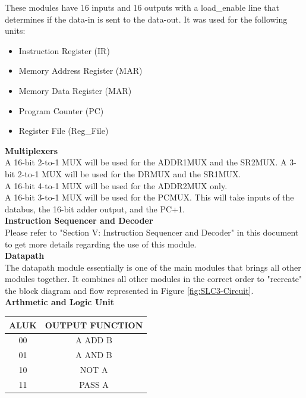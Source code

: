 \documentclass[journal, twocolumn, final,11pt,letterpaper]{IEEEtran}
\begin{document}
These modules have 16 inputs and 16 outputs with a load\_enable line that determines if the data-in is sent to the data-out. It was used for the following units: 
\begin{itemize}
	\item Instruction Register (IR)
	\item Memory Address Register (MAR)
	\item Memory Data Register (MAR)
	\item Program Counter (PC)
	\item Register File (Reg\_File)
\end{itemize} 

\normalsize\textbf{Multiplexers} \\

A 16-bit 2-to-1 MUX will be used for the ADDR1MUX and the SR2MUX. A 3-bit 2-to-1 MUX will be used for the DRMUX and the SR1MUX. \\

A 16-bit 4-to-1 MUX will be used for the ADDR2MUX only. \\

A 16-bit 3-to-1 MUX will be used for the PCMUX. This will take inputs of the databus, the 16-bit adder output, and the PC+1. \\

\normalsize\textbf{Instruction Sequencer and Decoder } \\

Please refer to "Section V: Instruction Sequencer and Decoder" in this document to get more details regarding the use of this module. \\

\normalsize\textbf{Datapath} \\

The datapath module essentially is one of the main modules that brings all other modules together. It combines all other modules in the correct order to "recreate" the block diagram and flow represented in Figure \ref{fig:SLC3-Circuit}.\\


\normalsize\textbf{Arthmetic and Logic Unit} \\
\begin{table}[htbp]
	\centering
	\begin{tabular}{cc}	%
		\toprule	%
		ALUK & OUTPUT FUNCTION \\
		\midrule
		00 & A ADD B \\
		01 & A AND B \\
		10 & NOT A \\
		11 & PASS A \\
		\bottomrule	%
	\end{tabular}%
	\label{tab:ALU-table}
\end{table}
\end{document}
